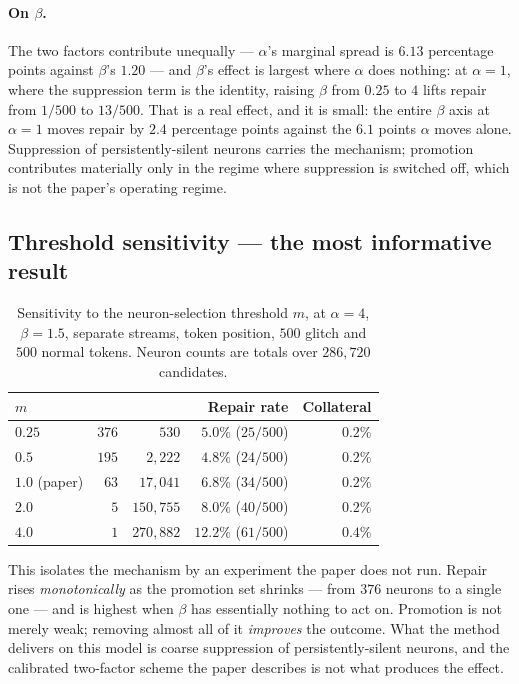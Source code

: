 \paragraph{On $\beta$.} The two factors contribute unequally --- $\alpha$'s
marginal spread is $6.13$ percentage points against $\beta$'s $1.20$ --- and
$\beta$'s effect is largest where $\alpha$ does nothing: at $\alpha = 1$, where
the suppression term is the identity, raising $\beta$ from $0.25$ to $4$ lifts
repair from $1/500$ to $13/500$. That is a real effect, and it is small: the
entire $\beta$ axis at $\alpha = 1$ moves repair by $2.4$ percentage points
against the $6.1$ points $\alpha$ moves alone. Suppression of persistently-silent
neurons carries the mechanism; promotion contributes materially only in the
regime where suppression is switched off, which is not the paper's operating
regime.

\subsection{Threshold sensitivity --- the most informative result}
\label{sec:msweep}

\begin{table}[h]
\centering
\caption{Sensitivity to the neuron-selection threshold $m$, at $\alpha = 4$,
$\beta = 1.5$, separate streams, token position, $500$ glitch and $500$ normal
tokens. Neuron counts are totals over $286{,}720$ candidates.}
\label{tab:msweep}
\begin{tabular}{lrrrr}
\toprule
$m$ & \Neunup{} & \Neundown{} & Repair rate & Collateral \\
\midrule
$0.25$        & $376$ & $530$       & $5.0\%$ ($25/500$) & $0.2\%$ \\
$0.5$         & $195$ & $2{,}222$   & $4.8\%$ ($24/500$) & $0.2\%$ \\
$1.0$ (paper) & $63$  & $17{,}041$  & $6.8\%$ ($34/500$) & $0.2\%$ \\
$2.0$         & $5$   & $150{,}755$ & $8.0\%$ ($40/500$) & $0.2\%$ \\
$4.0$         & $1$   & $270{,}882$ & $\mathbf{12.2\%}$ ($61/500$) & $0.4\%$ \\
\bottomrule
\end{tabular}
\end{table}

This isolates the mechanism by an experiment the paper does not run. Repair rises
\emph{monotonically} as the promotion set shrinks --- from $376$ neurons to a
single one --- and is highest when $\beta$ has essentially nothing to act on.
Promotion is not merely weak; removing almost all of it \emph{improves} the
outcome. What the method delivers on this model is coarse suppression of
persistently-silent neurons, and the calibrated two-factor scheme the paper
describes is not what produces the effect.

